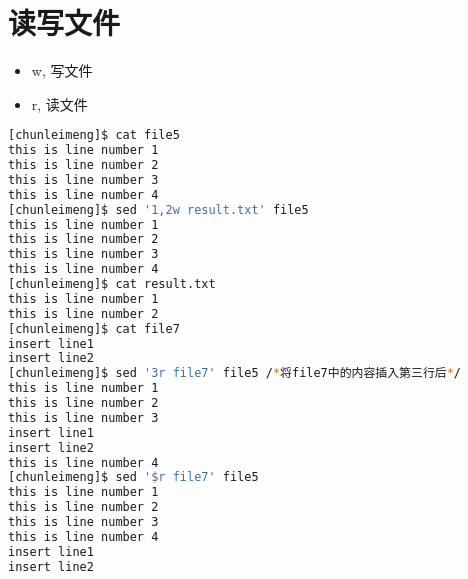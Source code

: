 \documentclass{article}
\begin{document}
\section{读写文件}
\begin{itemize}
	\item w, 写文件
	\item r, 读文件
\end{itemize}
\begin{lstlisting}[language=bash, caption={File}]
[chunleimeng]$ cat file5
this is line number 1
this is line number 2
this is line number 3
this is line number 4
[chunleimeng]$ sed '1,2w result.txt' file5
this is line number 1
this is line number 2
this is line number 3
this is line number 4
[chunleimeng]$ cat result.txt 
this is line number 1
this is line number 2
[chunleimeng]$ cat file7
insert line1
insert line2
[chunleimeng]$ sed '3r file7' file5 /*将file7中的内容插入第三行后*/
this is line number 1
this is line number 2
this is line number 3
insert line1
insert line2
this is line number 4
[chunleimeng]$ sed '$r file7' file5
this is line number 1
this is line number 2
this is line number 3
this is line number 4
insert line1
insert line2
\end{lstlisting}
\end{document}
